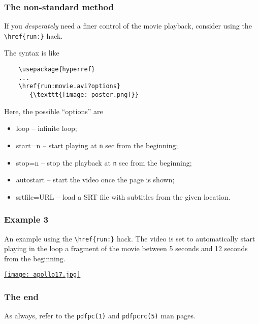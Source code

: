 \documentclass{beamer}
\newcommand{\opt}[1]{\texttt{#1}\xspace}
\begin{document}
\begin{frame}[fragile]
  \frametitle{The non-standard method}

  If you {\em desperately} need a finer control of the movie playback, consider
  using the \opt{\textbackslash href\{run:\}} hack.

  The syntax is like

  \begin{lstlisting}
    \usepackage{hyperref}
    ...
    \href{run:movie.avi?options}
       {\texttt{[image: poster.png]}}
  \end{lstlisting}

  Here, the possible ``options'' are
  \begin{itemize}
    \item loop -- infinite loop;
    \item start=n -- start playing at \opt{n} sec from the beginning;
    \item stop=n -- stop the playback at \opt{n} sec from the beginning;
    \item autostart -- start the video once the page is shown;
    \item srtfile=URL -- load a SRT file with subtitles from the given
      location.
  \end{itemize}

\end{frame}

\begin{frame}
  \frametitle{Example 3}

  An example using the \opt{\textbackslash href\{run:\}} hack. The
  video is set to automatically start playing in the loop a fragment of the
  movie between 5 seconds and 12 seconds from the beginning.

  \vspace{5pt}

  \begin{center}
    \href{run:apollo17.avi?autostart&loop&start=5&stop=12}
       {\texttt{[image: apollo17.jpg]}}
  \end{center}
\end{frame}

\begin{frame}
  \frametitle{The end}
  
  As always, refer to the \opt{pdfpc(1)} and \opt{pdfpcrc(5)} man pages.

\end{frame}
\end{document}
